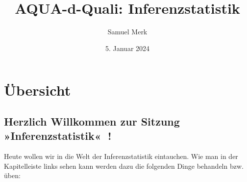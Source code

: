 \documentclass[
  letterpaper,
  DIV=11]{scrreprt}
\title{AQUA-d-Quali: Inferenzstatistik}
\author{Samuel Merk}
\date{5. Januar 2024}
\renewcommand*\contentsname{Inhaltsverzeichnis}
\newcommand\contentsname{Inhaltsverzeichnis}
\begin{document}
\maketitle

\renewcommand*\contentsname{Inhaltsverzeichnis}
{
\hypersetup{linkcolor=}
\setcounter{tocdepth}{2}
\tableofcontents
}

\chapter*{Übersicht}\label{uxfcbersicht}


\section*{Herzlich Willkommen zur Sitzung »Inferenzstatistik«
👋!}\label{herzlich-willkommen-zur-sitzung-inferenzstatistik}


Heute wollen wir in die Welt der Inferenzstatistik eintauchen. Wie man
in der Kapitelleiste links sehen kann werden dazu die folgenden Dinge
behandeln bzw. üben:
\end{document}
